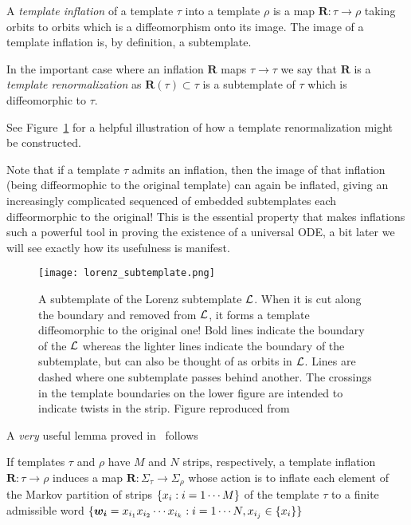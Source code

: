 \documentclass[paper.tex]{subfiles}
\begin{document}
\begin{definition}
  A  \emph{template inflation} of a template $\tau$ into a template $\rho$ is a map $\bm{R} : \tau \to \rho$ taking orbits to orbits which is a diffeomorphism onto its image.
  The image of a template inflation is, by definition, a subtemplate.
\end{definition}


\begin{definition}
  In the important case where an inflation $\bm{R}$ maps $\tau \to \tau$ we say that $\bm{R}$ is a \emph{template renormalization} as $\bm{R}(\tau) \subset \tau$ is a subtemplate of $\tau$ which
  is diffeomorphic to $\tau$.
\end{definition}


See Figure~\ref{fig:lorenz_subtemplate} for a helpful illustration of how a template renormalization might be constructed.


Note that if a template $\tau$ admits an inflation, then the image of that inflation (being diffeormophic to the original template) can again be inflated, giving an increasingly complicated sequenced of embedded
subtemplates each diffeormorphic to the original! This is the essential property that makes inflations such a powerful tool in proving the existence of a universal ODE, a bit later
we will see exactly how its usefulness is manifest.

\begin{figure}[h]
  \centering
  \texttt{[image: lorenz\_subtemplate.png]}
  \caption{A subtemplate of the Lorenz subtemplate $\mathcal{L}$. When it is cut along the boundary and removed from $\mathcal{L}$, it forms a template diffeomorphic to the original one!
    Bold lines indicate the boundary of the $\mathcal{L}$ whereas the lighter lines indicate the boundary of the subtemplate, but can also be thought of as orbits in $\mathcal{L}$.
    Lines are dashed where one subtemplate passes behind another. The crossings in the template boundaries on the lower figure
    are intended to indicate twists in the strip.
    Figure reproduced from~\cite{knottyode}}\label{fig:lorenz_subtemplate}
\end{figure}

A \emph{very} useful lemma proved in~\cite{knottyode} follows


\begin{lemma}
  If templates $\tau$ and $\rho$ have $M$ and $N$ strips, respectively, a template inflation $\bm{R}: \tau \to \rho$ induces a map $\bm{R}: \Sigma_\tau \to \Sigma_\rho$ whose action is to inflate each element of the Markov partition of strips $\{ x_i : i = 1\cdots M \}$ of the template $\tau$ to a finite
  admissible word $\{ \bm{w_i} = x_{i_1} x_{i_2} \cdots x_{i_k} : i = 1 \cdots N, x_{i_j} \in \{ x_i \} \}$\label{lemma:symbolic}
\end{lemma}
\end{document}

